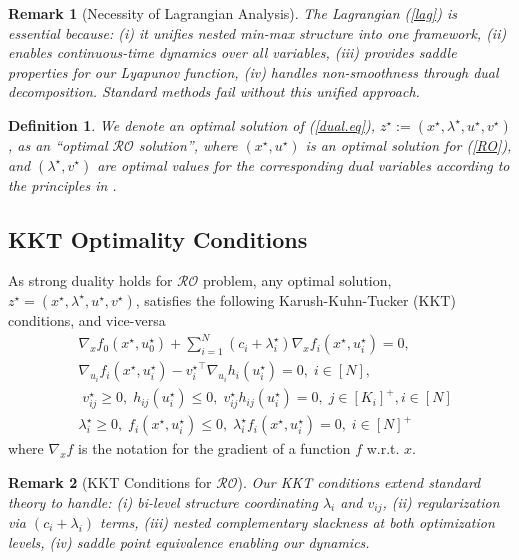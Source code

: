 \documentclass[journal,twoside,web]{ieeecolor}
\newcommand{\rev}[1]{\textcolor{revisionblue}{#1}}
\newtheorem{definition}{Definition}
\newtheorem{remark}{Remark}
\begin{document}
\begin{remark}[\rev{Necessity of Lagrangian Analysis}]
\rev{The Lagrangian (\ref{lag}) is essential because: (i) it unifies nested min-max structure into one framework, (ii) enables continuous-time dynamics over all variables, (iii) provides saddle properties for our Lyapunov function, (iv) handles non-smoothness through dual decomposition. Standard methods fail without this unified approach.}
\end{remark}

\begin{definition} \label{optimal_ro}
We denote an optimal solution of (\ref{dual.eq}), $z^\star:=(x^\star,\lambda^\star,u^\star,v^\star)$, as an ``optimal $\mathcal{RO}$ solution'', where $(x^\star, u^\star)$ is an optimal solution for (\ref{RO}), and $(\lambda^\star, v^\star)$ are optimal values for the corresponding dual variables according to the principles in \cite[Section~5.9.1]{boyd2004}.
\end{definition}

\subsection*{\rev{KKT Optimality Conditions}}

As strong duality holds for $\mathcal{RO}$ problem, any optimal solution, $z^\star=(x^\star,\lambda^\star,u^\star,v^\star)$, satisfies the following Karush-Kuhn-Tucker (KKT) conditions, and vice-versa \cite{boyd2004}
\begin{align}
&\nabla_x f_0(x^\star,u_0^\star)+  \sum_{i=1}^N(c_i+\lambda^\star_i) \nabla_x f_i(x^\star,u_i^\star)=0,\label{kkt1}\\
&\nabla_{u_i} f_i(x^\star,u_i^\star)-{v_i^\star}^\top \nabla_{u_i} h_i(u_i^\star)=0,\; i\in[N],\label{kkt2}\\
&\;v_{ij}^\star\geq 0,\; h_{ij}(u_i^\star)\leq 0,\;v_{ij}^\star h_{ij}(u_i^\star)=0,\;  j\in[K_i]^+, i\in[N] \label{kkt3}\\
&\lambda_i^\star\geq 0,\;f_{i}(x^\star,u_i^\star)\leq 0,\;\lambda_i^\star f_{i}(x^\star,u_i^\star)=0,\;i\in[N]^+ \label{kkt4}
\end{align}
where $\nabla_x f$ is the notation for the gradient of a function $f$ w.r.t. $x$.

\begin{remark}[\rev{KKT Conditions for $\mathcal{RO}$}]
\rev{Our KKT conditions extend standard theory \cite{boyd2004} to handle: (i) bi-level structure coordinating $\lambda_i$ and $v_{ij}$, (ii) regularization via $(c_i + \lambda_i)$ terms, (iii) nested complementary slackness at both optimization levels, (iv) saddle point equivalence enabling our dynamics.}
\end{remark}
\end{document}
